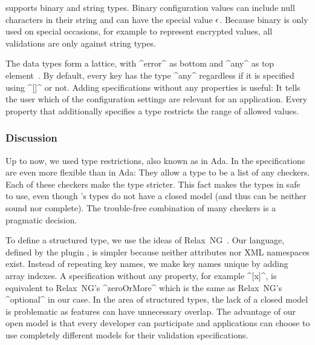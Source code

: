 \elektra{} supports binary and string types.
Binary configuration values can include null characters in their string and can have the special value $\epsilon$.
Because binary is only used on special occasions, for example to represent encrypted values, all validations are only against string types.

The data types form a lattice, with ^error^ as bottom and ^any^ as top element~\cite{harkes2016icedust,haldiman2009practical}.
By default, every key has the type ^any^ regardless if it is specified using ^[]^ or not.
Adding specifications without any properties is useful:
It tells the user which of the configuration settings are relevant for an application.
Every property that additionally specifies a type restricts the range of allowed values.

\subsubsection{Discussion}

Up to now, we used type restrictions, also known as  in Ada.
In \elektra{} the specifications are even more flexible than in Ada:
They allow a type to be a list of any checkers.
Each of these checkers make the type stricter.
This fact makes the types in \elektra{} safe to use, even though \elektra{}'s types do not have a closed model (and thus can be neither sound nor complete).
The trouble-free combination of many checkers is a pragmatic decision.


To define a structured type, we use the ideas of Relax~NG~\cite{clark2002relax}.
Our language, defined by the plugin , is simpler because neither attributes nor XML namespaces exist.
Instead of repeating key names, we make key names unique by adding array indexes.
A specification without any property, for example ^[x]^, is equivalent to Relax~NG's ^zeroOrMore^ which is the same as Relax~NG's ^optional^ in our case.
In the area of structured types, the lack of a closed model is problematic as features can have unnecessary overlap.
The advantage of our open model is that every developer can participate and applications can choose to use completely different models for their validation specifications.
















































